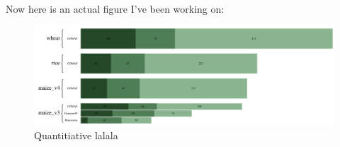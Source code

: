 \documentclass[utf8]{frontiersSCNS} %
\begin{document}
Now here is an actual figure I've been working on:

\begin{figure}[htbp]
\centering
\includegraphics{../../../reports/figures/annotation_quantities.pdf}
\caption{Quantitiative lalala}
\end{figure}
\end{document}
